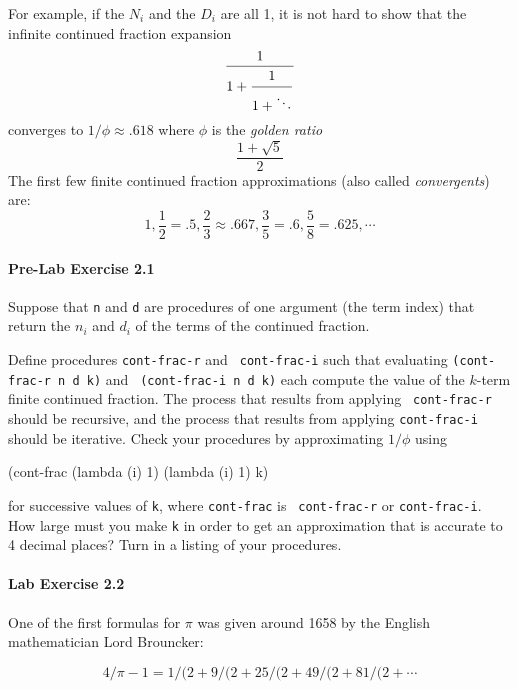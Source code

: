 For example, if the $N_i$ and the $D_i$ are all 1, it is not
hard to show that the infinite continued fraction expansion
\begin{displaymath}
{1 \over {\displaystyle 1 +
        {\strut 1 \over {\displaystyle 1 +\ddots } }}}
\end{displaymath}
converges to $1/\phi\approx .618$ where $\phi$ is the {\em golden ratio}
\begin{displaymath}
\frac{1+ \sqrt{5}}{2}
\end{displaymath}
The first few finite continued fraction approximations (also called
{\em convergents})  are:
\begin{displaymath}
1, \frac{1}{2}=.5, \frac{2}{3}\approx .667, \frac{3}{5}=.6,
\frac{5}{8}=.625, \cdots
\end{displaymath}

\paragraph{Pre-Lab Exercise 2.1}
Suppose that {\tt n} and {\tt d} are procedures
of one argument (the term index) that return the 
$n_i$ and $d_i$ of the terms of the continued fraction. 

Define procedures {\tt cont-frac-r} and {\tt
cont-frac-i} such that evaluating {\tt (cont-frac-r n d k)} and {\tt
(cont-frac-i n d k)} each compute the value of the $k$-term finite
continued fraction.  The process that results from applying {\tt
cont-frac-r} should be recursive, and the process that results from
applying {\tt cont-frac-i} should be iterative.  Check your procedures
by approximating $1/\phi$ using

\beginlisp
(cont-frac (lambda (i) 1)
           (lambda (i) 1)
           k)
\endlisp

for successive values of {\tt k}, where {\tt cont-frac} is {\tt
cont-frac-r} or {\tt cont-frac-i}.  How large must you make {\tt k}
in order to get an approximation that is accurate to 4 decimal places?
Turn in a listing of your procedures.

\paragraph{Lab Exercise 2.2}
One of the first formulas for $\pi$ was given around 1658 by the
English mathematician Lord Brouncker:

\begin{displaymath}
4/\pi -1  =  1/(2 + 9/(2 + 25/ (2 + 49/ (2 + 81 /(2 + \cdots
\end{displaymath}

